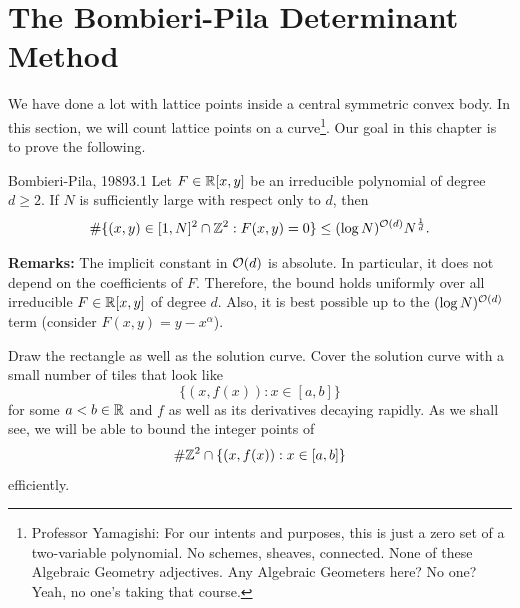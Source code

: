 \documentclass{Vorlesungstemplate_English} %
\begin{document}
\chapter{The Bombieri-Pila Determinant Method}
We have done a lot with lattice points inside a central symmetric convex body. In this section, we will count lattice points on a curve\footnote{Professor Yamagishi: For our intents and purposes, this is just a zero set of a two-variable polynomial. No schemes, sheaves, connected. None of these Algebraic Geometry adjectives. Any Algebraic Geometers here? No one? Yeah, no one's taking that course.}. Our goal in this chapter is to prove the following.
\begin{theorem}{Bombieri-Pila, 1989}{3.1}
  Let $F \in \mathbb{R}[x,y]$ be an irreducible polynomial of degree $d \geq 2$. If $N$ is sufficiently large with respect only to $d$, then
  \[ \#\{ (x,y) \in [1,N]^2 \cap \mathbb{Z}^2: F(x,y) = 0\} \leq (\log N)^{\mathcal{O}(d)}N^{\frac{1}{d}}.\]
\end{theorem}
\noindent \textbf{Remarks:} The implicit constant in $\mathcal{O}(d)$ is absolute. In particular, it does not depend on the coefficients of $F$. Therefore, the bound holds uniformly over all irreducible $F \in \mathbb{R}[x,y]$ of degree $d$. Also, it is best possible up to the $(\log N)^{\mathcal{O}(d)}$ term (consider $F(x,y) = y-x^{\alpha}$).
\begin{pf}
Draw the rectangle as well as the solution curve. Cover the solution curve with a small number of tiles that look like
\[ \{ (x,f(x)): x \in [a,b]\}\]
for some $a < b \in \mathbb{R}$ and $f$ as well as its derivatives decaying rapidly. As we shall see, we will be able to bound the integer points of
\[ \#\mathbb{Z}^2 \cap \{ (x,f(x)): x \in [a,b]\}\]
efficiently.
\end{pf}
\end{document}
